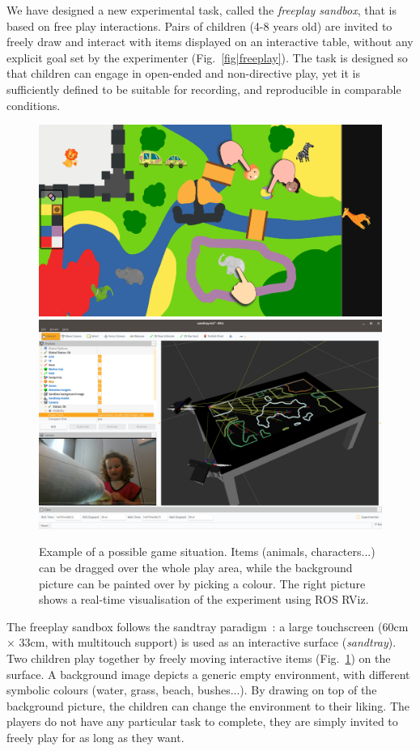 \documentclass{article}
\begin{document}
We have designed a new experimental task, called the \emph{freeplay sandbox}, that is based on 
free play interactions. Pairs of children (4-8 years old) are invited to freely draw and interact with items
displayed on an interactive table, without any explicit goal set by the experimenter (Fig.~\ref{fig|freeplay}).
The task is designed so that children can engage in open-ended and non-directive play, yet it is
sufficiently defined to be suitable for recording, and reproducible in comparable conditions.

\begin{figure}[ht!]
    \centering
    \includegraphics[width=0.52\linewidth]{sandbox}
    \hspace{0.2em}
    \includegraphics[width=0.46\linewidth]{rviz-sandtray}
    \caption{Example of a possible game situation. Items (animals,
    characters...) can be dragged over the whole play area, while the background
    picture can be painted over by picking a colour. The right picture shows a
    real-time visualisation of the experiment using ROS RViz.}

    \label{fig|sandbox}
\end{figure}

The freeplay sandbox follows the sandtray
paradigm~\cite{baxter2012touchscreen}: a large touchscreen (60cm $\times$ 33cm,
with multitouch support) is used as an interactive surface (\emph{sandtray}). Two children play together
by freely moving interactive items (Fig.~\ref{fig|sandbox}) on the surface. A background image
depicts a generic empty environment, with different symbolic colours (water,
grass, beach, bushes...). By drawing on top of the background picture, the
children can change the environment to their liking. The players do not have any particular task to
complete, they are simply invited to freely play for as long as they want.
\end{document}
